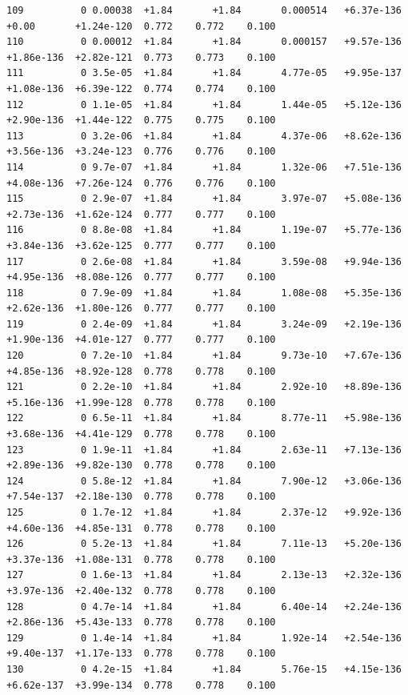 \documentclass[12pt]{article}
\numberwithin{equation}{section}
\begin{document}
\begin{lstlisting}
109          0 0.00038  +1.84       +1.84       0.000514   +6.37e-136  +0.00       +1.24e-120  0.772    0.772    0.100
110          0 0.00012  +1.84       +1.84       0.000157   +9.57e-136  +1.86e-136  +2.82e-121  0.773    0.773    0.100
111          0 3.5e-05  +1.84       +1.84       4.77e-05   +9.95e-137  +1.08e-136  +6.39e-122  0.774    0.774    0.100
112          0 1.1e-05  +1.84       +1.84       1.44e-05   +5.12e-136  +2.90e-136  +1.44e-122  0.775    0.775    0.100
113          0 3.2e-06  +1.84       +1.84       4.37e-06   +8.62e-136  +3.56e-136  +3.24e-123  0.776    0.776    0.100
114          0 9.7e-07  +1.84       +1.84       1.32e-06   +7.51e-136  +4.08e-136  +7.26e-124  0.776    0.776    0.100
115          0 2.9e-07  +1.84       +1.84       3.97e-07   +5.08e-136  +2.73e-136  +1.62e-124  0.777    0.777    0.100
116          0 8.8e-08  +1.84       +1.84       1.19e-07   +5.77e-136  +3.84e-136  +3.62e-125  0.777    0.777    0.100
117          0 2.6e-08  +1.84       +1.84       3.59e-08   +9.94e-136  +4.95e-136  +8.08e-126  0.777    0.777    0.100
118          0 7.9e-09  +1.84       +1.84       1.08e-08   +5.35e-136  +2.62e-136  +1.80e-126  0.777    0.777    0.100
119          0 2.4e-09  +1.84       +1.84       3.24e-09   +2.19e-136  +1.90e-136  +4.01e-127  0.777    0.777    0.100
120          0 7.2e-10  +1.84       +1.84       9.73e-10   +7.67e-136  +4.85e-136  +8.92e-128  0.778    0.778    0.100
121          0 2.2e-10  +1.84       +1.84       2.92e-10   +8.89e-136  +5.16e-136  +1.99e-128  0.778    0.778    0.100
122          0 6.5e-11  +1.84       +1.84       8.77e-11   +5.98e-136  +3.68e-136  +4.41e-129  0.778    0.778    0.100
123          0 1.9e-11  +1.84       +1.84       2.63e-11   +7.13e-136  +2.89e-136  +9.82e-130  0.778    0.778    0.100
124          0 5.8e-12  +1.84       +1.84       7.90e-12   +3.06e-136  +7.54e-137  +2.18e-130  0.778    0.778    0.100
125          0 1.7e-12  +1.84       +1.84       2.37e-12   +9.92e-136  +4.60e-136  +4.85e-131  0.778    0.778    0.100
126          0 5.2e-13  +1.84       +1.84       7.11e-13   +5.20e-136  +3.37e-136  +1.08e-131  0.778    0.778    0.100
127          0 1.6e-13  +1.84       +1.84       2.13e-13   +2.32e-136  +3.97e-136  +2.40e-132  0.778    0.778    0.100
128          0 4.7e-14  +1.84       +1.84       6.40e-14   +2.24e-136  +2.86e-136  +5.43e-133  0.778    0.778    0.100
129          0 1.4e-14  +1.84       +1.84       1.92e-14   +2.54e-136  +9.40e-137  +1.17e-133  0.778    0.778    0.100
130          0 4.2e-15  +1.84       +1.84       5.76e-15   +4.15e-136  +6.62e-137  +3.99e-134  0.778    0.778    0.100

\end{lstlisting}
\end{document}
